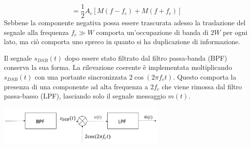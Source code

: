 \[
= \frac{1}{2} A_c [M(f - f_c) + M(f + f_c)]
\]
Sebbene la componente negativa possa essere trascurata adesso la traslazione del segnale alla frequenza $f_c \gg W$ comporta un'occupazione di banda di $2W$ per ogni lato, ma ciò comporta uno spreco in quanto si ha duplicazione di informazione. 

\begin{center}
\end{center}


Il segnale \( s_{DSB}(t) \) dopo essere stato filtrato dal filtro passa-banda (BPF) conserva la sua forma.
La rilevazione coerente è implementata moltiplicando \( s_{DSB}(t) \) con una portante sincronizzata \( 2\cos(2\pi f_c t) \).
Questo comporta la presenza di una componente ad alta frequenza a \( 2f_c \) che viene rimossa dal filtro passa-basso (LPF), lasciando solo il segnale messaggio \( m(t) \).
\begin{center}
    \includegraphics[width=0.625\textwidth]{imgs/analog_pam_receiver.png}
\end{center}

